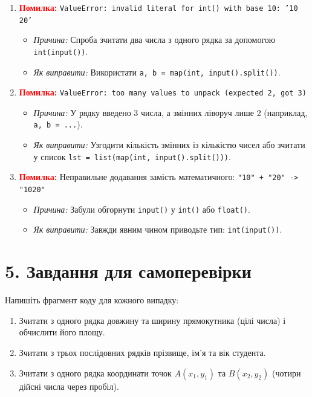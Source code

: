 \documentclass{scrreprt}
\begin{document}
	\begin{enumerate}[label=\arabic*.]
		\item \textbf{\textcolor{red}{Помилка:}} \texttt{ValueError: invalid literal for int() with base 10: '10 20'}
		\begin{itemize}
			\item \textit{Причина:} Спроба зчитати два числа з одного рядка за допомогою \texttt{int(input())}.
			\item \textit{Як виправити:} Використати \texttt{a, b = map(int, input().split())}.
		\end{itemize}

		\item \textbf{\textcolor{red}{Помилка:}} \texttt{ValueError: too many values to unpack (expected 2, got 3)}
		\begin{itemize}
			\item \textit{Причина:} У рядку введено 3 числа, а змінних ліворуч лише 2 (наприклад, \texttt{a, b = ...}).
			\item \textit{Як виправити:} Узгодити кількість змінних із кількістю чисел або зчитати у список \texttt{lst = list(map(int, input().split()))}.
		\end{itemize}

		\item \textbf{\textcolor{red}{Помилка:}} Неправильне додавання замість математичного: \texttt{"10" + "20" -> "1020"}
		\begin{itemize}
			\item \textit{Причина:} Забули обгорнути \texttt{input()} у \texttt{int()} або \texttt{float()}.
			\item \textit{Як виправити:} Завжди явним чином приводьте тип: \texttt{int(input())}.
		\end{itemize}
	\end{enumerate}

	\vspace{0.5cm}

	\section*{5. Завдання для самоперевірки}

	Напишіть фрагмент коду для кожного випадку:
	\begin{enumerate}[label=\Alph*.]
		\item Зчитати з одного рядка довжину та ширину прямокутника (цілі числа) і обчислити його площу.
		\item Зчитати з трьох послідовних рядків прізвище, ім'я та вік студента.
		\item Зчитати з одного рядка координати точок $A(x_1, y_1)$ та $B(x_2, y_2)$ (чотири дійсні числа через пробіл).
	\end{enumerate}
\end{document}
